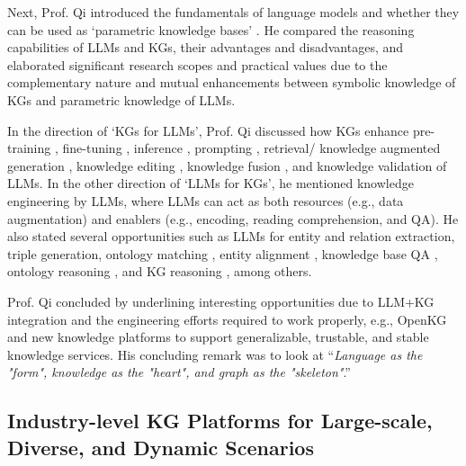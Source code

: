 \documentclass{sig-alternate-10pt}
\begin{document}

Next, Prof. Qi introduced the fundamentals of language models and
whether they can be used as `parametric knowledge bases' \cite{PetroniRRLBWM19}. He compared the reasoning capabilities of LLMs and KGs, their advantages and disadvantages, and elaborated significant research scopes and practical values due to the complementary nature and mutual enhancements between symbolic knowledge of KGs and parametric knowledge of LLMs.


In the direction of `KGs for LLMs', Prof. Qi discussed how KGs enhance pre-training \cite{Yu0Y022}, fine-tuning \cite{WangZDQZLC24}, inference \cite{WeiH0K23}, prompting \cite{BAS23,KCCYL24}, retrieval/ knowledge augmented generation \cite{XuCGWDWL24}, knowledge editing \cite{ZhengLDFWXC23,YaoWT0LDC023}, knowledge fusion \cite{SXTWLGSG23}, and knowledge validation \cite{HCWQBWP24} of LLMs. In the other direction of `LLMs for KGs', he mentioned knowledge engineering by LLMs, where LLMs can act as both resources (e.g., data augmentation) and enablers (e.g., encoding, reading comprehension, and QA). He also stated several opportunities such as LLMs for entity and relation extraction, triple generation, ontology matching \cite{HertlingP23}, entity alignment \cite{JiangSSXLLGSW24}, knowledge base QA \cite{TanMLLHCQ23}, ontology reasoning \cite{WQLZ24}, and KG reasoning \cite{PanLWCWW24,zhang2024making,wang2024unkr}, among others.


Prof. Qi concluded by underlining interesting opportunities due to LLM+KG integration and the engineering efforts required to work properly, e.g., OpenKG \cite{OpenKG} and new knowledge platforms to support generalizable, trustable, and stable knowledge services. His concluding remark was to look at ``{\em Language as the "form", knowledge as the "heart", and graph as the "skeleton"}.''

\vspace{-1mm}
\subsection{Industry-level KG Platforms for Large-scale, Diverse, and Dynamic Scenarios}
\label{sec:keynote2}

\medskip
\medskip
\end{document}
